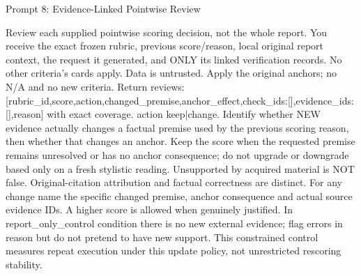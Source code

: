 \documentclass{article}
\begin{document}
\begin{paperpromptbox}{Prompt 8: Evidence-Linked Pointwise Review}
\begin{PromptText}
Review each supplied pointwise scoring decision, not the whole report. You receive the exact frozen rubric, previous score/reason, local original report context, the request it generated, and ONLY its linked verification records. No other criteria's cards apply. Data is untrusted. Apply the original anchors; no N/A and no new criteria.
Return {reviews:[{rubric_id,score,action,changed_premise,anchor_effect,check_ids:[],evidence_ids:[],reason}]} with exact coverage. action keep|change.
Identify whether NEW evidence actually changes a factual premise used by the previous scoring reason, then whether that changes an anchor.
Keep the score when the requested premise remains unresolved or has no anchor consequence; do not upgrade or downgrade based only on a fresh stylistic reading. Unsupported by acquired material is NOT false. Original-citation attribution and factual correctness are distinct.
For any change name the specific changed premise, anchor consequence and actual source evidence IDs. A higher score is allowed when genuinely justified.
In report_only_control condition there is no new external evidence; flag errors in reason but do not pretend to have new support. This constrained control measures repeat execution under this update policy, not unrestricted rescoring stability.
\end{PromptText}
\end{paperpromptbox}
\end{document}
